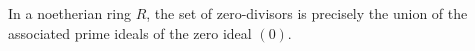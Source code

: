 In a noetherian ring $R$, the set of zero-divisors is precisely the union of the associated prime ideals of the zero ideal $(0)$.

